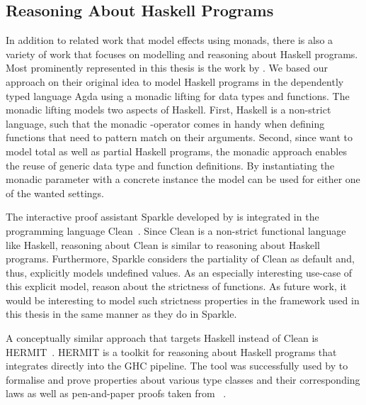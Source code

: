 \subsection{Reasoning About Haskell Programs}

In addition to related work that model effects using monads, there is also a variety of work that focuses on modelling and reasoning about Haskell programs.
Most prominently represented in this thesis is the work by \citet{abel2005verifying}.
We based our approach on their original idea to model Haskell programs in the dependently typed language Agda using a monadic lifting for data types and functions.
The monadic lifting models two aspects of Haskell.
First, Haskell is a non\--strict language, such that the monadic \hinl{>>=}\--operator comes in handy when defining functions that need to pattern match on their arguments.
Second, since \citeauthor{abel2005verifying} want to model total as well as partial Haskell programs, the monadic approach enables the reuse of generic data type and function definitions.
By instantiating the monadic parameter with a concrete instance the model can be used for either one of the wanted settings.

The interactive proof assistant Sparkle developed by \citet{demol2002theorem} is integrated in the programming language Clean~\citep{brus1987clean}.
Since Clean is a non\--strict functional language like Haskell, reasoning about Clean is similar to reasoning about Haskell programs.
Furthermore, Sparkle considers the partiality of Clean as default and, thus, explicitly models undefined values.
As an especially interesting use\--case of this explicit model, \citet{vaneekelen2006proof} reason about the strictness of functions.
As future work, it would be interesting to model such strictness properties in the framework used in this thesis in the same manner as they do in Sparkle.

A conceptually similar approach that targets Haskell instead of Clean is HERMIT~\citep{farmer2015reasoning}.
HERMIT is a toolkit for reasoning about Haskell programs that integrates directly into the GHC pipeline.
The tool was successfully used by \citeauthor{farmer2015reasoning} to formalise and prove properties about various type classes and their corresponding laws as well as pen\--and\--paper proofs taken from ~\citep{bird2010pearls}.

